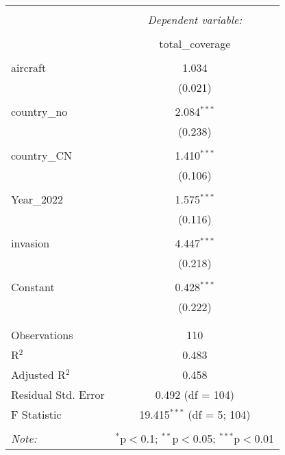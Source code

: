 
\begin{table}[!htbp] \centering 
  \caption{} 
  \label{} 
\begin{tabular}{@{\extracolsep{5pt}}lc} 
\\[-1.8ex]\hline 
\hline \\[-1.8ex] 
 & \multicolumn{1}{c}{\textit{Dependent variable:}} \\ 
\cline{2-2} 
\\[-1.8ex] & total\_coverage \\ 
\hline \\[-1.8ex] 
 aircraft & 1.034 \\ 
  & (0.021) \\ 
  & \\ 
 country\_no & 2.084$^{***}$ \\ 
  & (0.238) \\ 
  & \\ 
 country\_CN & 1.410$^{***}$ \\ 
  & (0.106) \\ 
  & \\ 
 Year\_2022 & 1.575$^{***}$ \\ 
  & (0.116) \\ 
  & \\ 
 invasion & 4.447$^{***}$ \\ 
  & (0.218) \\ 
  & \\ 
 Constant & 0.428$^{***}$ \\ 
  & (0.222) \\ 
  & \\ 
\hline \\[-1.8ex] 
Observations & 110 \\ 
R$^{2}$ & 0.483 \\ 
Adjusted R$^{2}$ & 0.458 \\ 
Residual Std. Error & 0.492 (df = 104) \\ 
F Statistic & 19.415$^{***}$ (df = 5; 104) \\ 
\hline 
\hline \\[-1.8ex] 
\textit{Note:}  & \multicolumn{1}{r}{$^{*}$p$<$0.1; $^{**}$p$<$0.05; $^{***}$p$<$0.01} \\ 
\end{tabular} 
\end{table} 
